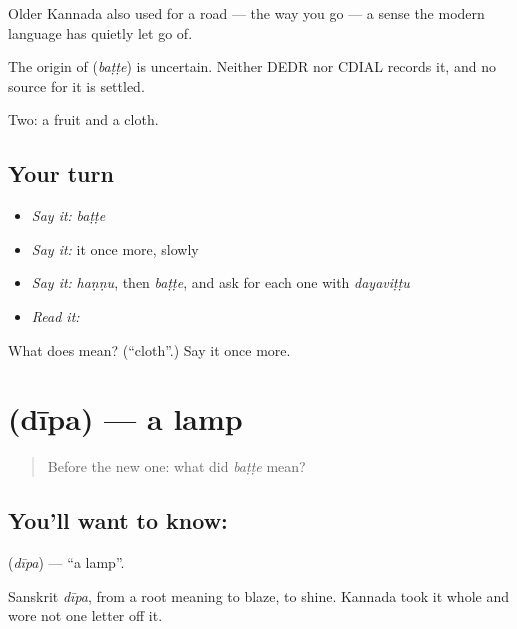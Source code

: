 Older Kannada also used  for a road — the way you go — a sense the modern language has quietly let go of.

\begin{cousinweb}
The origin of \textbf{} (\emph{baṭṭe}) is uncertain. Neither DEDR nor CDIAL records it, and no source for it is settled.
\end{cousinweb}

\begin{grammarlens}[title={What you've built}]
Two: a fruit and a cloth.
\end{grammarlens}

\subsection*{Your turn}
\begin{itemize}
\raggedright
  \item \emph{Say it:} \emph{baṭṭe}
  \item \emph{Say it:} it once more, slowly
  \item \emph{Say it:} \emph{haṇṇu}, then \emph{baṭṭe}, and ask for each one with \emph{dayaviṭṭu}
  \item \emph{Read it:} \textbf{}
\end{itemize}

\begin{tcolorbox}[breakable,colback=teal!4,colframe=teal!35!black,title={Before you move on}]
What does  mean? (\textquotedblleft{}cloth\textquotedblright{}.) Say it once more.
\end{tcolorbox}
\section[\texorpdfstring{\kn{ದೀಪ} (dīpa)}{ದೀಪ (dīpa)}]{ (dīpa) — a lamp}

\label{lesson:KA-C46-lamp}



\begin{quote}
Before the new one: what did \emph{baṭṭe} mean?
\end{quote}

\subsection*{You'll want to know: }
\textbf{} (\emph{dīpa}) — \textquotedblleft{}a lamp\textquotedblright{}.

Sanskrit \emph{dīpa}, from a root meaning to blaze, to shine. Kannada took it whole and wore not one letter off it.

